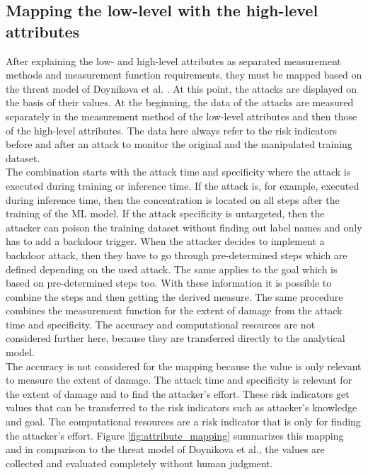 \subsection{Mapping the low-level with the high-level attributes}
\label{sec:map_low_high}

After explaining the low- and high-level attributes as separated measurement methods and measurement function requirements, they must be mapped based on the threat model of Doynikova et al. \cite{DBLP:conf/crisis/DoynikovaNGK20}. At this
point, the attacks are displayed on the basis of their values. At the beginning, the data of the attacks are measured separately in the measurement method of the low-level attributes and then those of
the high-level attributes. The data here always refer to the risk indicators before and after an attack to monitor the original and the manipulated training dataset. \\
The combination starts with the attack time and specificity where the attack is executed during training or inference time. If the attack is, for example, executed during inference time, then the concentration is located on all steps after the training of the ML model. If the attack specificity is untargeted, then the attacker can poison the training dataset without finding out label names and only has to add a backdoor trigger. When the attacker decides to implement a backdoor attack, then they have to go through pre-determined steps which are defined depending on the used attack. The same applies to the goal which is based on pre-determined steps too. With these information it is possible to combine the steps and then getting the derived measure. The same procedure combines the measurement function for the extent of damage from the attack time and specificity. The accuracy and computational resources are not considered further here, because they are transferred directly to the analytical model. \\
The accuracy is not considered for the mapping because the value is only relevant to measure the extent of damage. The attack time and specificity is relevant for the extent of damage and to find the attacker's effort. These risk indicators get values that can be transferred to the risk indicators such as attacker's
knowledge and goal. The computational resources are a risk indicator that is only for finding the attacker's effort. Figure \ref{fig:attribute_mapping} summarizes this mapping and in comparison to
the threat model of Doynikova et al., the values are collected and evaluated completely without human judgment.

